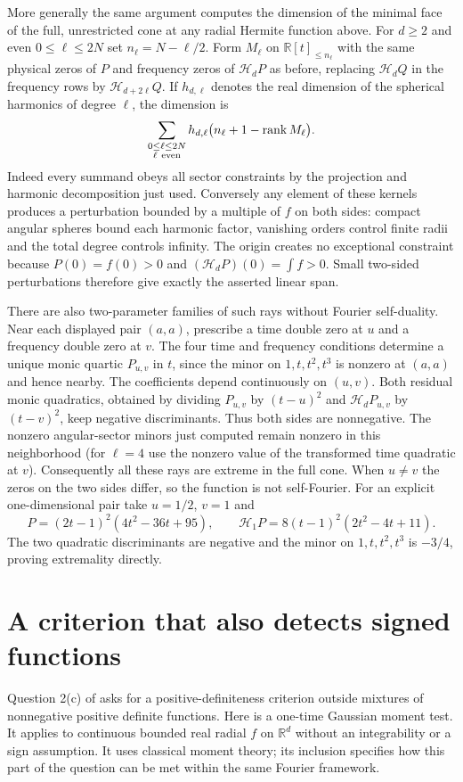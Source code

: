\documentclass[11pt,a4paper]{article}
\numberwithin{equation}{section}
\begin{document}
More generally the same argument computes the dimension of the minimal
face of the full, unrestricted cone at any radial Hermite function above.
For $d\ge2$ and even $0\le\ell\le2N$ set $n_\ell=N-\ell/2$.
Form $M_\ell$ on $\mathbb R[t]_{\le n_\ell}$ with the same physical zeros
of $P$ and frequency zeros of $\mathcal H_dP$ as before, replacing
$\mathcal H_dQ$ in the frequency rows by $\mathcal H_{d+2\ell}Q$.
If $h_{d,\ell}$ denotes the real dimension of the spherical harmonics
of degree $\ell$, the dimension is
\[
 \sum_{\substack{0\le\ell\le2N\\\ell\ {\rm even}}}
 h_{d,\ell}\big(n_\ell+1-\operatorname{rank}M_\ell\big).
\]
Indeed every summand obeys all sector constraints by the projection and
harmonic decomposition just used. Conversely any element of these kernels
produces a perturbation bounded by a multiple of $f$ on both sides:
compact angular spheres bound each harmonic factor, vanishing orders
control finite radii and the total degree controls infinity. The origin
creates no exceptional constraint because $P(0)=f(0)>0$ and
$(\mathcal H_dP)(0)=\int f>0$. Small two-sided perturbations therefore
give exactly the asserted linear span.

There are also two-parameter families of such rays without Fourier
self-duality. Near each displayed pair $(a,a)$, prescribe a time double
zero at $u$ and a frequency double zero at $v$. The four time and frequency
conditions determine a unique monic quartic $P_{u,v}$ in $t$, since
the minor on $1,t,t^2,t^3$ is nonzero at $(a,a)$ and hence nearby.
The coefficients depend continuously on $(u,v)$. Both residual monic
quadratics, obtained by dividing $P_{u,v}$ by $(t-u)^2$ and
$\mathcal H_dP_{u,v}$ by $(t-v)^2$, keep negative discriminants.
Thus both sides are nonnegative. The nonzero angular-sector minors just
computed remain nonzero in this neighborhood (for $\ell=4$ use the
nonzero value of the transformed time quadratic at $v$).
Consequently all these rays are extreme in the full cone. When $u\ne v$
the zeros on the two sides differ, so the function is not self-Fourier.
For an explicit one-dimensional pair take $u=1/2$, $v=1$ and
\[
 P=(2t-1)^2(4t^2-36t+95),\qquad
 \mathcal H_1P=8(t-1)^2(2t^2-4t+11).
\]
The two quadratic discriminants are negative and the minor on
$1,t,t^2,t^3$ is $-3/4$, proving extremality directly.

\section{A criterion that also detects signed functions}
\label{sec:signed}
Question 2(c) of \cite{JMR2009} asks for a positive-definiteness criterion outside mixtures of nonnegative positive definite functions. Here is a one-time Gaussian moment test. It applies to continuous bounded real radial $f$ on $\mathbb R^d$ without an integrability or a sign assumption. It uses classical moment theory; its inclusion specifies how this part of the question can be met within the same Fourier framework.
\end{document}
